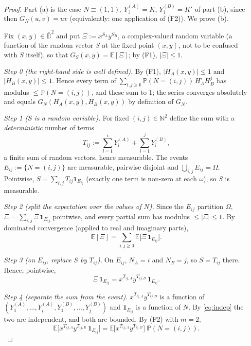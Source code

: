 \documentclass[11pt]{article}
\theoremstyle{definition}
\theoremstyle{remark}
\newcommand{\E}{\mathbb{E}}
\newcommand{\Prob}{\mathbb{P}}
\begin{document}
\begin{proof}
Part (a) is the case $N\equiv(1,1)$, $Y^{(A)}_1=K$, $Y^{(B)}_1=K'$ of part (b), since then $G_N(u,v)=uv$ (equivalently: one application of (F2)). We prove (b).

Fix $(x,y)\in\bar{\mathbb D}^2$ and put $\Xi:=x^{S_A}y^{S_B}$, a complex-valued random variable (a function of the random vector $S$ at the fixed point $(x,y)$, not to be confused with $S$ itself), so that $G_S(x,y)=\E[\Xi]$; by (F1), $|\Xi|\le1$.

\emph{Step 0 (the right-hand side is well defined).} By (F1), $|H_A(x,y)|\le1$ and $|H_B(x,y)|\le1$. Hence every term of $\sum_{i,j\ge0}\Prob(N=(i,j))\,H_A^iH_B^j$ has modulus $\le\Prob(N=(i,j))$, and these sum to 1; the series converges absolutely and equals $G_N(H_A(x,y),H_B(x,y))$ by definition of $G_N$.

\emph{Step 1 ($S$ is a random variable).} For fixed $(i,j)\in\mathbb N^2$ define the sum with a \emph{deterministic} number of terms
\[
T_{ij}:=\sum_{l=1}^{i}Y^{(A)}_l+\sum_{l=1}^{j}Y^{(B)}_l ,
\]
a finite sum of random vectors, hence measurable. The events $E_{ij}:=\{N=(i,j)\}$ are measurable, pairwise disjoint and $\bigcup_{i,j}E_{ij}=\Omega$. Pointwise, $S=\sum_{i,j}T_{ij}\mathbf 1_{E_{ij}}$ (exactly one term is non-zero at each $\omega$), so $S$ is measurable.

\emph{Step 2 (split the expectation over the values of $N$).} Since the $E_{ij}$ partition $\Omega$, $\Xi=\sum_{i,j}\Xi\,\mathbf 1_{E_{ij}}$ pointwise, and every partial sum has modulus $\le|\Xi|\le1$. By dominated convergence (applied to real and imaginary parts),
\begin{equation}\label{eq:split}
\E[\Xi]=\sum_{i,j\ge0}\E\big[\Xi\,\mathbf 1_{E_{ij}}\big].
\end{equation}

\emph{Step 3 (on $E_{ij}$, replace $S$ by $T_{ij}$).} On $E_{ij}$, $N_A=i$ and $N_B=j$, so $S=T_{ij}$ there. Hence, pointwise,
\begin{equation}\label{eq:replace}
\Xi\,\mathbf 1_{E_{ij}}=x^{T_{ij,A}}y^{T_{ij,B}}\,\mathbf 1_{E_{ij}} .
\end{equation}

\emph{Step 4 (separate the sum from the event).} $x^{T_{ij,A}}y^{T_{ij,B}}$ is a function of $(Y^{(A)}_1,\dots,Y^{(A)}_i,Y^{(B)}_1,\dots,Y^{(B)}_j)$ and $\mathbf 1_{E_{ij}}$ is a function of $N$. By \eqref{eq:indep} the two are independent, and both are bounded. By (F2) with $m=2$,
\begin{equation}\label{eq:sep}
\E\big[x^{T_{ij,A}}y^{T_{ij,B}}\,\mathbf 1_{E_{ij}}\big]=\E\big[x^{T_{ij,A}}y^{T_{ij,B}}\big]\;\Prob(N=(i,j)).
\end{equation}


\end{proof}
\end{document}
